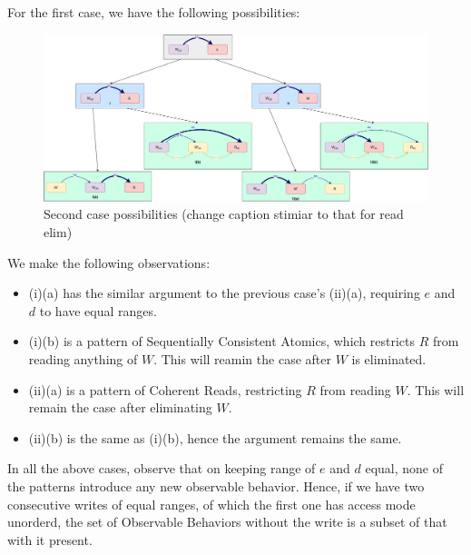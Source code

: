     For the first case, we have the following possibilities:
    \begin{figure}[H]
        \centering
        \includegraphics[scale=0.3]{Elimination/WriteElimProof/ProofParts/Part4Case2.pdf}
        \caption{Second case possibilities (change caption stimiar to that for read elim)}
    \end{figure}

    We make the following observations:
    \begin{itemize}
        \item (i)(a) has the similar argument to the previous case's (ii)(a), requiring $e$ and $d$ to have equal ranges.
        \item (i)(b) is a pattern of Sequentially Consistent Atomics, which restricts $R$ from reading anything of $W$. This will reamin the case after $W$ is eliminated. 
        \item (ii)(a) is a pattern of Coherent Reads, restricting $R$ from reading $W$. This will remain the case after eliminating $W$.
        \item (ii)(b) is the same as (i)(b), hence the argument remains the same.  
    \end{itemize}

    In all the above cases, observe that on keeping range of $e$ and $d$ equal, none of the patterns introduce any new observable behavior. Hence, if we have two consecutive writes of equal ranges, of which the first one has access mode unorderd, the set of Observable Behaviors without the write is a subset of that with it present. 
